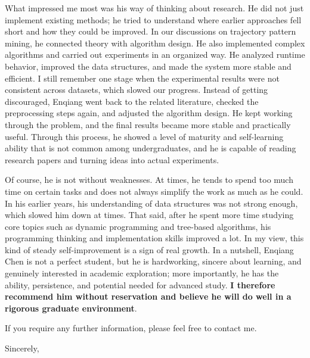 \documentclass[12pt]{YNUletter}
\begin{document}
\begin{letter}{\vspace{-3em}}
What impressed me most was his way of thinking about research. He did not just implement existing methods; he tried to understand where earlier approaches fell short and how they could be improved. In our discussions on trajectory pattern mining, he connected theory with algorithm design. He also implemented complex algorithms and carried out experiments in an organized way. He analyzed runtime behavior, improved the data structures, and made the system more stable and efficient. I still remember one stage when the experimental results were not consistent across datasets, which slowed our progress. Instead of getting discouraged, Enqiang went back to the related literature, checked the preprocessing steps again, and adjusted the algorithm design. He kept working through the problem, and the final results became more stable and practically useful. Through this process, he showed a level of maturity and self-learning ability that is not common among undergraduates, and he is capable of reading research papers and turning ideas into actual experiments.

Of course, he is not without weaknesses. At times, he tends to spend too much time on certain tasks and does not always simplify the work as much as he could. In his earlier years, his understanding of data structures was not strong enough, which slowed him down at times. That said, after he spent more time studying core topics such as dynamic programming and tree-based algorithms, his programming thinking and implementation skills improved a lot. In my view, this kind of steady self-improvement is a sign of real growth. In a nutshell, Enqiang Chen is not a perfect student, but he is hardworking, sincere about learning, and genuinely interested in academic exploration; more importantly, he has the ability, persistence, and potential needed for advanced study. \textbf{I therefore recommend him without reservation and believe he will do well in a rigorous graduate environment}.

If you require any further information, please feel free to contact me.

\closing{Sincerely,}




\end{letter}
\end{document}
